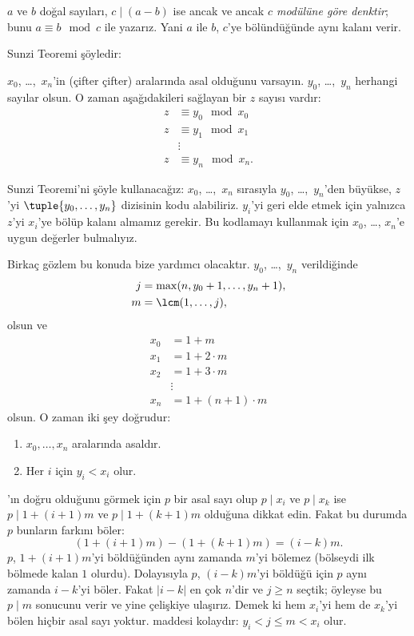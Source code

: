 \begin{defn}
$a$ ve $b$ doğal sayıları, $c\mid(a-b)$ ise ancak ve ancak
\emph{$c$ modülüne göre denktir}; bunu $a\equiv b\mod c$ ile yazarız. Yani
$a$ ile $b$, $c$'ye bölündüğünde aynı kalanı verir.
\end{defn}

Sunzi Teoremi şöyledir:
\begin{thm}
$x_0$, \dots,~$x_n$'in (çifter çifter) aralarında asal olduğunu varsayın.
$y_0$, \dots,~$y_n$ herhangi sayılar olsun. O zaman aşağıdakileri sağlayan
bir $z$ sayısı vardır:
\begin{align*}
z & \equiv y_0 \mod x_0 \\
z & \equiv y_1 \mod x_1 \\
& \vdots  \\
z & \equiv y_n \mod x_n.
\end{align*}
\end{thm}

Sunzi Teoremi'ni şöyle kullanacağız: $x_0$, \dots,~$x_n$ sırasıyla
$y_0$, \dots,~$y_n$'den büyükse, $z$'yi $\tuple{y_0,\dots,y_n}$ dizisinin
kodu alabiliriz. $y_i$'yi geri elde etmek için yalnızca $z$'yi $x_i$'ye
bölüp kalanı almamız gerekir. Bu kodlamayı kullanmak için $x_0$, \dots,
$x_n$'e uygun değerler bulmalıyız.

Birkaç gözlem bu konuda bize yardımcı olacaktır. $y_0$, \dots,~$y_n$
verildiğinde
\begin{align*}
j &= \max(n, y_0 + 1, \dots, y_n + 1), \\
m &= \lcm(1,\dots,j),
\end{align*}
olsun ve
\begin{align*}
x_0 & = 1 + m \\
x_1 & = 1 + 2 \cdot m \\
x_2 & = 1 + 3 \cdot m \\
& \vdots  \\
x_n & = 1 + (n+1) \cdot m
\end{align*}
olsun. O zaman iki şey doğrudur:
\begin{enumerate}
\item{} $x_0,\dots,x_n$ aralarında asaldır.
\item{} Her $i$ için $y_i<x_i$ olur.
\end{enumerate}
'ın doğru olduğunu görmek için $p$ bir asal sayı olup
$p\mid x_i$ ve $p\mid x_k$ ise $p\mid 1+(i+1)m$ ve
$p\mid 1+(k+1)m$ olduğuna dikkat edin. Fakat bu durumda $p$ bunların
farkını böler:
\[
(1 + (i+1)m) - (1+ (k+1)m) = (i-k) m.
\]
$p$, $1+(i+1)m$'yi böldüğünden aynı zamanda $m$'yi bölemez (bölseydi ilk
bölmede kalan $1$ olurdu). Dolayısıyla $p$, $(i-k)m$'yi böldüğü için
$p$ aynı zamanda $i-k$'yi böler. Fakat $\left|i-k\right|$ en çok $n$'dir ve $j\geq n$
seçtik; öyleyse bu $p\mid m$ sonucunu verir ve yine çelişkiye ulaşırız.
Demek ki hem $x_i$'yi hem de $x_k$'yi bölen hiçbir asal sayı yoktur.
 maddesi kolaydır: $y_i<j\leq m<x_i$ olur.

